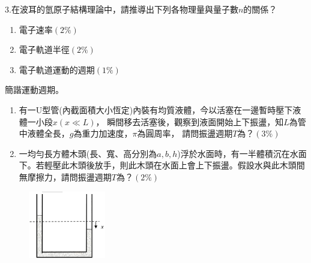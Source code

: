 \documentclass[cn,10pt,math=newtx]{elegantbook}
\begin{document}
\newpage



\begin{example}
   3.在波耳的氫原子結構理論中，請推導出下列各物理量與量子數$n$的關係？
   \begin{enumerate}[label=(\arabic*)]
     \item 電子速率$( 2\%)$
     \item 電子軌道半徑$( 2\%)$
     \item 電子軌道運動的週期$( 1\%)$
      \end{enumerate}

    \rightline{[成德高中教甄109]}
\end{example}
\begin{solution}
    
\end{solution}

\newpage


\begin{example}
    簡諧運動週期。
    \begin{enumerate}[label=(\arabic*)]
        \item 有一U型管(內截面積大小恆定)內裝有均質液體，今以活塞在一邊暫時壓下液體一小段$x(x\ll L)$，
        瞬間移去活塞後，觀察到液面開始上下振盪，知$L$為管中液體全長，$g$為重力加速度，$\pi$為圓周率，
        請問振盪週期$T$為？$( 3\% )$
        \item 一均勻長方體木頭(長、寬、高分別為$a, b, h$)浮於水面時，有一半體積沉在水面下。若輕壓此木頭後放手，則此木頭在水面上會上下振盪。假設水與此木頭間無摩擦力，請問振盪週期$T$為？$( 2\%)$
    \end{enumerate}
    
    \rightline{[成德高中教甄109]}
\end{example}
\begin{solution}

\end{solution}
\begin{figure}[htbp]
    \flushright
    \includegraphics[width=0.3\textwidth]{image/109成德44.png}
  \end{figure}
\newpage
\end{document}
